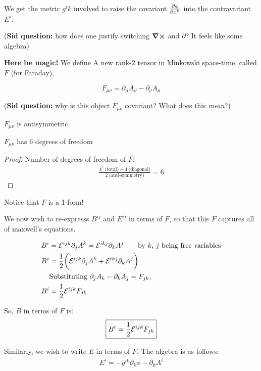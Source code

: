 We get the metric $g^ik$ involved to raise the covariant $\pdv{\phi}{x^k}$
into the contravariant $E^i$.

(\textbf{Sid question:} how does one justify switching $\curl$ and $\partial$? It feels like some algebra)

\textbf{Here be magic!} We define A new rank-$2$ tensor in Minkowski space-time,
called $F$ (for Faraday),

\begin{equation}
    \boxed{F_{\mu \nu} = \partial_\mu A_\nu - \partial_\nu A_\mu}
\end{equation}

(\textbf{Sid question:} why is this object $F_{\mu \nu}$ covariant? What does this \textit{mean}?)

\begin{lemma}
$F_{\mu \nu}$ is antisymmetric.
\end{lemma}

\begin{lemma}
$F_{\mu \nu}$ has 6 degrees of freedom
\end{lemma}
\begin{proof}
Number of degrees of freedom of $F$: 
\begin{align*}
\frac{4^2~\text{(total)} - 4~\text{(diagonal)}}{2~\text{(anti-symmetry)}} = 6
\end{align*}
\end{proof}

Notice that $F$ is a 1-form!

We now wish to re-expresss $B^{ij}$ and $E^{ij}$ in terms of $F$, so that
this $F$ captures all of maxwell's equations.

\begin{align*}
    B^i &= \mathcal{E}^{ijk}  \partial_j A^k = \mathcal{E}^{ikj} \partial_k A^j \tag*{by $k$, $j$ being free variables} \\
    B^i &= \frac{1}{2} \bigg( \mathcal{E}^{ijk} \partial_j A^k + \mathcal{E}^{ikj} \partial_k A^j \bigg) \\
        &\text{Substituting $\partial_j A_k - \partial_k A_j = F_{jk}$, } \\
    B^i &= \frac{1}{2} \mathcal{E}^{ijk} F_{jk}
\end{align*}


So, $B$ in terms of $F$ is:
\begin{equation}
    \boxed{B^i = \frac{1}{2} \mathcal{E}^{ijk} F_{jk}}
\end{equation}

Similarly, we wish to write $E$ in terms of $F$. The algebra is as follows:
\begin{align*}
    E^i = -g^{ik} \partial_k \phi - \partial_0 A^i
\end{align*}

